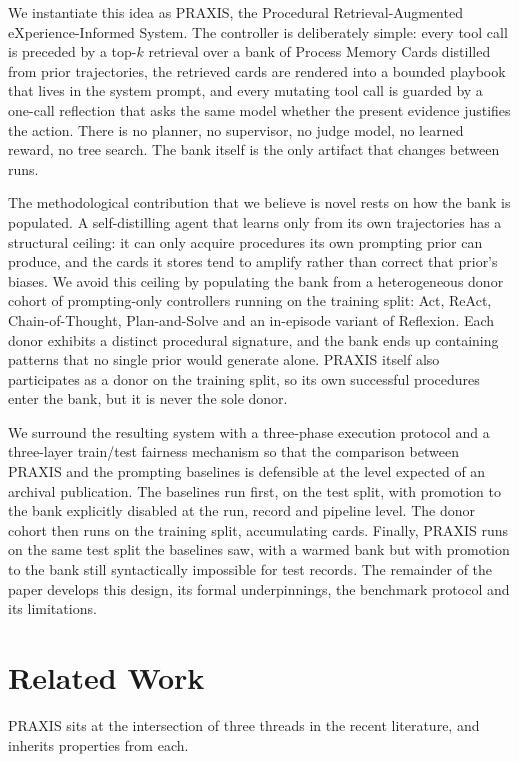 \documentclass[conference]{IEEEtran}
\begin{document}
We instantiate this idea as PRAXIS, the Procedural
Retrieval-Augmented eXperience-Informed System. The controller is
deliberately simple: every tool call is preceded by a top-$k$
retrieval over a bank of Process Memory Cards distilled from prior
trajectories, the retrieved cards are rendered into a bounded
playbook that lives in the system prompt, and every mutating tool
call is guarded by a one-call reflection that asks the same model
whether the present evidence justifies the action. There is no
planner, no supervisor, no judge model, no learned reward, no
tree search. The bank itself is the only artifact that changes
between runs.

The methodological contribution that we believe is novel rests on
how the bank is populated. A self-distilling agent that learns
only from its own trajectories has a structural ceiling: it can
only acquire procedures its own prompting prior can produce, and
the cards it stores tend to amplify rather than correct that
prior's biases. We avoid this ceiling by populating the bank from
a heterogeneous donor cohort of prompting-only controllers running
on the training split: Act, ReAct, Chain-of-Thought, Plan-and-Solve
and an in-episode variant of Reflexion. Each donor exhibits a
distinct procedural signature, and the bank ends up containing
patterns that no single prior would generate alone. PRAXIS itself
also participates as a donor on the training split, so its own
successful procedures enter the bank, but it is never the sole
donor.

We surround the resulting system with a three-phase execution
protocol and a three-layer train/test fairness mechanism so that
the comparison between PRAXIS and the prompting baselines is
defensible at the level expected of an archival publication. The
baselines run first, on the test split, with promotion to the bank
explicitly disabled at the run, record and pipeline level. The
donor cohort then runs on the training split, accumulating cards.
Finally, PRAXIS runs on the same test split the baselines saw,
with a warmed bank but with promotion to the bank still
syntactically impossible for test records. The remainder of the
paper develops this design, its formal underpinnings, the
benchmark protocol and its limitations.

\section{Related Work}

PRAXIS sits at the intersection of three threads in the recent
literature, and inherits properties from each.
\end{document}
